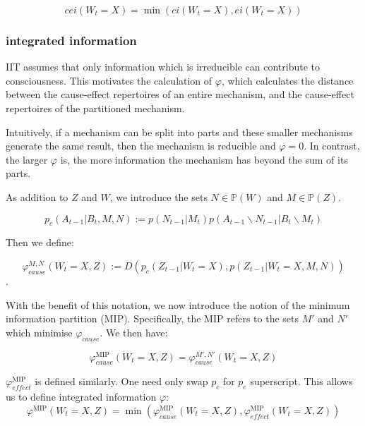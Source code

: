 \begin{equation}
\label{def:cei}
cei(W_{t} = X) = \min\left(ci(W_{t} = X), ei(W_{t} = X) \right)
\end{equation}

\subsubsection{integrated information}
\label{sec:mech_integration}
IIT assumes that only information which is irreducible can contribute to consciousness. This motivates the calculation of $\varphi$, which calculates the distance between the cause-effect repertoires of an entire mechanism, and the cause-effect repertoires of the partitioned mechanism. 

Intuitively, if a mechanism can be split into parts and these smaller mechanisms generate the same result, then the mechanism is reducible and $\varphi=0$. In contrast, the larger $\varphi$ is, the more information the mechanism has beyond the sum of its parts.

As addition to $Z$ and $W$, we introduce the sets $N \in \mathbb{P}(W)$ and $M \in \mathbb{P}(Z)$.

\begin{equation}
\label{def:preMIP}
p_c(A_{t-1}|B_t ,M, N):= p(N_{t-1}|M_t) p(A_{t-1} \backslash N_{t-1} |B_t \backslash M_t)
\end{equation}

Then we define:

\begin{equation}
\label{def:phi2}
\varphi_{cause}^{M,N}(W_t=X, Z) := D \left( p_c(Z_{t-1}|W_t=X) ,p(Z_{t-1}|W_{t} = X,M,N)  \right)
\end{equation}.

With the benefit of this notation, we now introduce the notion of the minimum information partition (MIP). Specifically, the MIP refers to the sets $M'$ and $N'$ which minimise $\varphi_{cause}$. We then have:

\begin{equation}
\label{def:phi3}
\varphi_{cause}^{\text{MIP}}(W_t=X, Z)  = \varphi_{cause}^{M',N'}(W_t=X, Z) 
\end{equation}

$\varphi^{\text{MIP}}_{effect}$ is defined similarly. One need only swap $p_c$ for $p_e$ superscript. This allows us to define integrated information $\varphi$:
\begin{equation}
\label{def:phi}
\varphi^{\text{MIP}}(W_t=X, Z) = \min \left( \varphi_{cause}^{\text{MIP}}(W_t=X, Z), \varphi_{effect}^{\text{MIP}}(W_t=X, Z)  \right) 
\end{equation}



